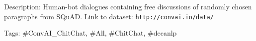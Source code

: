 Description\+: Human-\/bot dialogues containing free discussions of randomly chosen paragraphs from S\+Qu\+AD. Link to dataset\+: \href{http://convai.io/data/}{\tt http\+://convai.\+io/data/}

Tags\+: \#\+Conv\+A\+I\+\_\+\+Chit\+Chat, \#\+All, \#\+Chit\+Chat, \#decanlp 